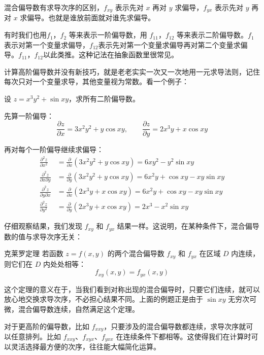 混合偏导数有求导次序的区别，$f_{xy}$ 表示先对 $x$ 再对 $y$ 求偏导，$f_{yx}$ 表示先对 $y$ 再对 $x$ 求偏导。也就是谁放前面就对谁先求偏导。

有时我们也用$f_1$，$f_2$ 等来表示一阶偏导数，用 $f_{11}$，$f_{12}$ 等来表示二阶偏导数。$f_1$表示对第一个变量求偏导，$f_{12}$表示先对第一个变量求偏导再对第二个变量求偏导。$f_{11}$，$f_{12}$以此类推。这种记法在抽象函数里很常见。

计算高阶偏导数并没有新技巧，就是老老实实一次又一次地用一元求导法则，记住每次只对一个变量求导，其他变量视为常数。看一个例子：

\begin{myexample}
设 $z = x^3y^2 + \sin xy$，求所有二阶偏导数。

先算一阶偏导：
\[
\frac{\partial z}{\partial x} = 3x^2y^2 + y\cos xy,\qquad
\frac{\partial z}{\partial y} = 2x^3y + x\cos xy
\]

再对每个一阶偏导继续求偏导：
\begin{align*}
\frac{\partial^2 z}{\partial x^2}
&= \frac{\partial}{\partial x}(3x^2y^2 + y\cos xy)
= 6xy^2 - y^2\sin xy \\[4pt]
\frac{\partial^2 z}{\partial x\partial y}
&= \frac{\partial}{\partial y}(3x^2y^2 + y\cos xy)
= 6x^2y + \cos xy - xy\sin xy \\[4pt]
\frac{\partial^2 z}{\partial y\partial x}
&= \frac{\partial}{\partial x}(2x^3y + x\cos xy)
= 6x^2y + \cos xy - xy\sin xy \\[4pt]
\frac{\partial^2 z}{\partial y^2}
&= \frac{\partial}{\partial y}(2x^3y + x\cos xy)
= 2x^3 - x^2\sin xy
\end{align*}
\end{myexample}

仔细观察结果，我们发现 $f_{xy}$ 和 $f_{yx}$ 结果一样。这说明，在某种条件下，混合偏导数的值与求导次序无关：

\begin{theorem}{克莱罗定理}{}
若函数 $z = f(x,y)$ 的两个混合偏导数 $f_{xy}$ 和 $f_{yx}$ 在区域 $D$ 内连续，则它们在 $D$ 内处处相等：
\[
f_{xy}(x,y) = f_{yx}(x,y)
\]
\end{theorem}

这个定理的意义在于，当我们看到对称出现的混合偏导时，只要它们连续，就可以放心地交换求导次序，不必担心结果不同。上面的例题正是由于 $\sin xy$ 无穷次可微，混合偏导数连续，自然满足这个定理。

对于更高阶的偏导数，比如 $f_{xxy}$，只要涉及的混合偏导数都连续，求导次序就可以任意排列。比如 $f_{xxy}$、$f_{xyx}$、$f_{yxx}$ 在连续条件下都相等。这使得我们在计算时可以灵活选择最方便的次序，往往能大幅简化运算。

